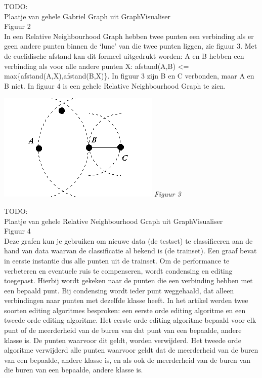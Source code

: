 \documentclass{article}
\begin{document}
TODO: \\
Plaatje van gehele Gabriel Graph uit GraphVisualiser\\
Figuur  2\\

In een Relative Neighbourhood Graph hebben twee punten een verbinding als er geen andere punten binnen de ‘lune’ van die twee punten liggen, zie figuur 3. Met de euclidische afstand kan dit formeel uitgedrukt worden: A en B hebben een verbinding als voor alle andere punten X:  afstand(A,B) <= max\{afstand(A,X),afstand(B,X)\}. In figuur 3 zijn B en C  verbonden, maar A en B niet. In figuur 4 is een gehele Relative Neighbourhood Graph te zien.\\

\begin{center} \includegraphics[keepaspectratio=true]{RNGburen} \emph{Figuur 3} \end{center}

TODO: \\
Plaatje van gehele Relative Neighbourhood Graph uit GraphVisualiser\\
Figuur 4\\

Deze grafen kun je gebruiken om nieuwe data (de testset) te classificeren aan de hand van data waarvan de classificatie al bekend is (de trainset). Een graaf bevat in eerste instantie dus alle punten uit de trainset. Om de performance te verbeteren en eventuele ruis te compenseren, wordt condensing en editing toegepast. Hierbij wordt gekeken naar de punten die een verbinding hebben met een bepaald punt. Bij condensing wordt ieder punt weggehaald, dat alleen verbindingen naar punten met dezelfde klasse heeft. In het artikel werden twee soorten editing algoritmes besproken: een eerste orde editing algoritme en een tweede orde editing algoritme. Het eerste orde editing algoritme bepaald voor elk punt of de meerderheid van de buren van dat punt van een bepaalde, andere klasse is. De punten waarvoor dit geldt, worden verwijderd. Het tweede orde algoritme verwijderd alle punten waarvoor geldt dat de meerderheid van de buren van een bepaalde, andere klasse is, en als ook de meerderheid van de buren van die buren van een bepaalde, andere klasse is.
\end{document}
